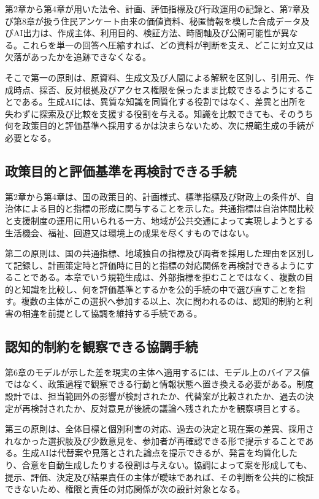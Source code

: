 第2章から第4章が用いた法令、計画、評価指標及び行政運用の記録と、第7章及び第8章が扱う住民アンケート由来の価値資料、秘匿情報を模した合成データ及びAI出力は、作成主体、利用目的、検証方法、時間軸及び公開可能性が異なる。これらを単一の回答へ圧縮すれば、どの資料が判断を支え、どこに対立又は欠落があったかを追跡できなくなる。

そこで第一の原則は、原資料、生成文及び人間による解釈を区別し、引用元、作成時点、採否、反対根拠及びアクセス権限を保ったまま比較できるようにすることである。生成AIには、異質な知識を同質化する役割ではなく、差異と出所を失わずに探索及び比較を支援する役割を与える。知識を比較できても、そのうち何を政策目的と評価基準へ採用するかは決まらないため、次に規範生成の手続が必要となる。

\subsection{政策目的と評価基準を再検討できる手続}

第2章から第4章は、国の政策目的、計画様式、標準指標及び財政上の条件が、自治体による目的と指標の形成に関与することを示した。共通指標は自治体間比較と支援制度の運用に用いられる一方、地域が公共交通によって実現しようとする生活機会、福祉、回遊又は環境上の成果を尽くすものではない。

第二の原則は、国の共通指標、地域独自の指標及び両者を採用した理由を区別して記録し、計画策定時と評価時に目的と指標の対応関係を再検討できるようにすることである。本章でいう規範生成は、外部指標を拒むことではなく、複数の目的と知識を比較し、何を評価基準とするかを公的手続の中で選び直すことを指す。複数の主体がこの選択へ参加する以上、次に問われるのは、認知的制約と利害の相違を前提として協調を維持する手続である。

\subsection{認知的制約を観察できる協調手続}

第6章のモデルが示した差を現実の主体へ適用するには、モデル上のバイアス値ではなく、政策過程で観察できる行動と情報状態へ置き換える必要がある。制度設計では、担当範囲外の影響が検討されたか、代替案が比較されたか、過去の決定が再検討されたか、反対意見が後続の議論へ残されたかを観察項目とする。

第三の原則は、全体目標と個別利害の対応、過去の決定と現在案の差異、採用されなかった選択肢及び少数意見を、参加者が再確認できる形で提示することである。生成AIは代替案や見落とされた論点を提示できるが、発言を均質化したり、合意を自動生成したりする役割は与えない。協調によって案を形成しても、提示、評価、決定及び結果責任の主体が曖昧であれば、その判断を公共的に検証できないため、権限と責任の対応関係が次の設計対象となる。

